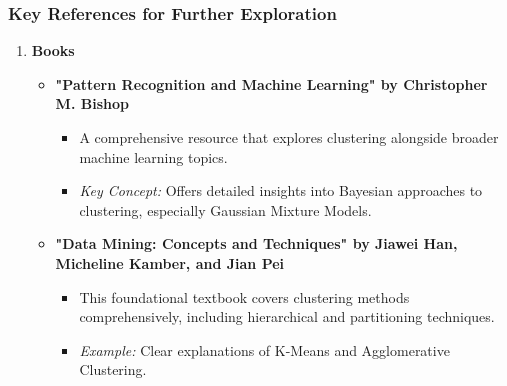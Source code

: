 \documentclass[aspectratio=169]{beamer}
\begin{document}
\begin{frame}[fragile]
    \frametitle{Key References for Further Exploration}
    \begin{enumerate}
        \item \textbf{Books}
            \begin{itemize}
                \item \textbf{"Pattern Recognition and Machine Learning" by Christopher M. Bishop}
                    \begin{itemize}
                        \item A comprehensive resource that explores clustering alongside broader machine learning topics.
                        \item \textit{Key Concept:} Offers detailed insights into Bayesian approaches to clustering, especially Gaussian Mixture Models.
                    \end{itemize}
                \item \textbf{"Data Mining: Concepts and Techniques" by Jiawei Han, Micheline Kamber, and Jian Pei}
                    \begin{itemize}
                        \item This foundational textbook covers clustering methods comprehensively, including hierarchical and partitioning techniques.
                        \item \textit{Example:} Clear explanations of K-Means and Agglomerative Clustering.
                    \end{itemize}
            \end{itemize}
    \end{enumerate}
\end{frame}
\end{document}
